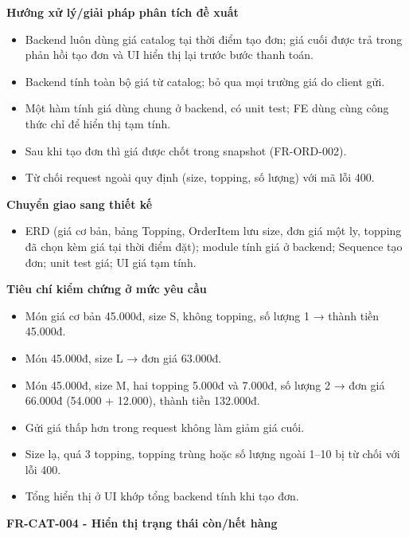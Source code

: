 \documentclass[11pt,a4paper,oneside]{report}
\begin{document}
\textbf{Hướng xử lý/giải pháp phân tích đề xuất}

\begin{itemize}
\item
  Backend luôn dùng giá catalog tại thời điểm tạo đơn; giá cuối được trả trong phản hồi tạo đơn và UI hiển thị lại trước bước thanh toán.
\item
  Backend tính toàn bộ giá từ catalog; bỏ qua mọi trường giá do client gửi.
\item
  Một hàm tính giá dùng chung ở backend, có unit test; FE dùng cùng công thức chỉ để hiển thị tạm tính.
\item
  Sau khi tạo đơn thì giá được chốt trong snapshot (FR-ORD-002).
\item
  Từ chối request ngoài quy định (size, topping, số lượng) với mã lỗi 400.
\end{itemize}

\textbf{Chuyển giao sang thiết kế}

\begin{itemize}
\item
  ERD (giá cơ bản, bảng Topping, OrderItem lưu size, đơn giá một ly, topping đã chọn kèm giá tại thời điểm đặt); module tính giá ở backend; Sequence tạo đơn; unit test giá; UI giá tạm tính.
\end{itemize}

\textbf{Tiêu chí kiểm chứng ở mức yêu cầu}

\begin{itemize}
\item
  Món giá cơ bản 45.000đ, size S, không topping, số lượng 1 → thành tiền 45.000đ.
\item
  Món 45.000đ, size L → đơn giá 63.000đ.
\item
  Món 45.000đ, size M, hai topping 5.000đ và 7.000đ, số lượng 2 → đơn giá 66.000đ (54.000 + 12.000), thành tiền 132.000đ.
\item
  Gửi giá thấp hơn trong request không làm giảm giá cuối.
\item
  Size lạ, quá 3 topping, topping trùng hoặc số lượng ngoài 1--10 bị từ chối với lỗi 400.
\item
  Tổng hiển thị ở UI khớp tổng backend tính khi tạo đơn.
\end{itemize}

\textbf{FR-CAT-004 - Hiển thị trạng thái còn/hết hàng}
\end{document}
